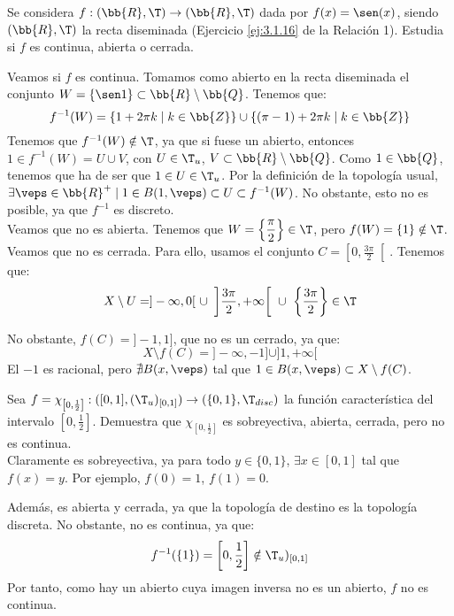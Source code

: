 \begin{ejercicio}
    Se considera $f : (\bb{R},\T) \to (\bb{R},\T)$ dada por $f(x) = \sen(x)$, siendo $(\bb{R},\T)$ la recta diseminada (Ejercicio \ref{ej:3.1.16} de la Relación 1). Estudia si $f$ es continua, abierta o cerrada.

    Veamos si $f$ es continua. Tomamos como abierto en la recta diseminada el conjunto $W=\{\sen 1\}\subset \bb{R}\setminus \bb{Q}$. Tenemos que:
    \begin{equation*}
        f^{-1}(W)=\{1+2\pi k\mid k\in \bb{Z}\} \cup \{(\pi-1)+2\pi k\mid k\in \bb{Z}\}
    \end{equation*}
    Tenemos que $f^{-1}(W)\notin \T$, ya que si fuese un abierto, entonces $1\in f^{-1}(W)=U\cup V$, con $U\in \T_u$, $V\subset \bb{R}\setminus \bb{Q}$. Como $1\in \bb{Q}$, tenemos que ha de ser que $1\in U\in \T_u$. Por la definición de la topología usual, $\exists \veps\in \bb{R}^+\mid 1\in B(1,\veps)\subset U\subset f^{-1}(W)$. No obstante, esto no es posible, ya que $f^{-1}$ es discreto.\\

    Veamos que no es abierta. Tenemos que $W=\left\{\dfrac{\pi}{2}\right\}\in \T$, pero $f(W)=\{1\}\notin \T$.\\

    Veamos que no es cerrada. Para ello, usamos el conjunto $C=\left[0,\frac{3\pi}{2}\right[$. Tenemos que:
    \begin{equation*}
        X\setminus U = ]-\infty, 0[~\cup~\left]\frac{3\pi}{2},+\infty\right[~\cup~ \left\{\frac{3\pi}{2}\right\} \in \T
    \end{equation*}

    No obstante, $f(C) = ]-1,1]$, que no es un cerrado, ya que:
    \begin{equation*}
        X\setminus f(C) = ]-\infty, -1]\cup ]1,+\infty[
    \end{equation*}
    El $-1$ es racional, pero $\nexists B(x,\veps)$ tal que $1\in B(x,\veps)\subset X\setminus f(C)$.
\end{ejercicio}

\begin{ejercicio}
    Sea $f=\chi_{\left[0,\frac{1}{2}\right]}: ([0, 1],(\T_u)_{[0,1]}) \to (\{0, 1\}, \T_{disc})$ la función característica del intervalo $\left[0,\frac{1}{2}\right]$.
    Demuestra que $\chi_{\left[0,\frac{1}{2}\right]}$ es sobreyectiva, abierta, cerrada, pero no es continua.\\

    Claramente es sobreyectiva, ya para todo $y\in \{0,1\}$, $\exists x\in [0,1]$ tal que $f(x)=y$. Por ejemplo, $f(0)=1$, $f(1)=0$.

    Además, es abierta y cerrada, ya que la topología de destino es la topología discreta. No obstante, no es continua, ya que:
    \begin{equation*}
        f^{-1}(\{1\}) = \left[0,\frac{1}{2}\right]\notin \T_u)_{[0,1]}
    \end{equation*}
    Por tanto, como hay un abierto cuya imagen inversa no es un abierto, $f$ no es continua.
\end{ejercicio}


